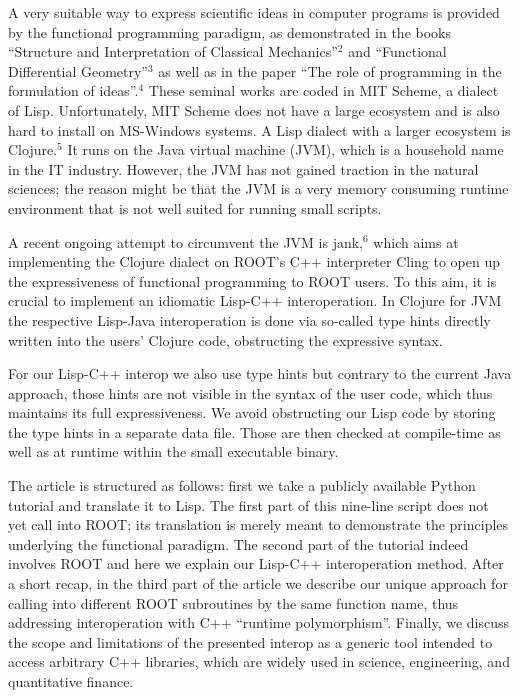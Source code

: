 \documentclass{IEEEcsmag}
\begin{document}
A very suitable way to express scientific ideas in computer programs is provided by the functional programming paradigm, as demonstrated in the books “Structure and Interpretation of Classical Mechanics”$^{2}$ and “Functional Differential Geometry”$^{3}$ as well as in the paper “The role of programming in the formulation of ideas”.$^{4}$ These seminal works are coded in MIT Scheme, a dialect of Lisp. Unfortunately, MIT Scheme does not have a large ecosystem and is also hard to install on MS-Windows systems. A Lisp dialect with a larger ecosystem is Clojure.$^{5}$ It runs on the Java virtual machine (JVM), which is a household name in the IT industry. However, the JVM has not gained traction in the natural sciences; the reason might be that the JVM is a very memory consuming runtime environment that is not well suited for running small scripts.

A recent ongoing attempt to circumvent the JVM is jank,$^{6}$ which aims at implementing the Clojure dialect on ROOT’s C++ interpreter Cling to open up the expressiveness of functional programming to ROOT users. To this aim, it is crucial to implement an idiomatic Lisp-C++ interoperation. In Clojure for JVM the respective Lisp-Java interoperation is done via so-called type hints directly written into the users’ Clojure code, obstructing the expressive syntax.

For our Lisp-C++ interop we also use type hints but contrary to the current Java approach, those hints are not visible in the syntax of the user code, which thus maintains its full expressiveness. We avoid obstructing our Lisp code by storing the type hints in a separate data file. Those are then checked at compile-time as well as at runtime within the small executable binary.

The article is structured as follows: first we take a publicly available Python tutorial and translate it to Lisp. The first part of this nine-line script does not yet call into ROOT; its translation is merely meant to demonstrate the principles underlying the functional paradigm. The second part of the tutorial indeed involves ROOT and here we explain our Lisp-C++ interoperation method. After a short recap, in the third part of the article we describe our unique approach for calling into different ROOT subroutines by the same function name, thus addressing interoperation with C++ “runtime polymorphism”. Finally, we discuss the scope and limitations of the presented interop as a generic tool intended to access arbitrary C++ libraries, which are widely used in science, engineering, and quantitative finance.\vspace*{-5pt}
\end{document}

